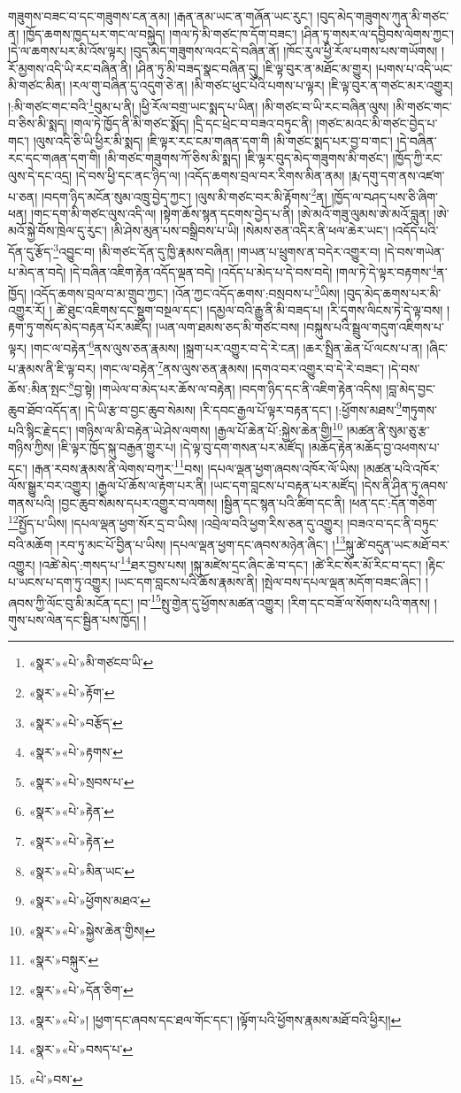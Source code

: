 \documentclass[12pt,a4paper]{book}
\begin{document}
གཟུགས་བཟང་བ་དང་གཟུགས་ངན་ནམ། །རྒན་ནམ་ཡང་ན་གཞོན་ཡང་རུང་། །བུད་མེད་གཟུགས་ཀུན་མི་གཙང་ན། །ཁྱོད་ཆགས་ཁྱད་པར་གང་ལ་བསྐྱེད། །གལ་ཏེ་མི་གཙང་ཁ་དོག་བཟང་། །ཤིན་ཏུ་གསར་ལ་དབྱིབས་ལེགས་ཀྱང་། །དེ་ལ་ཆགས་པར་མི་འོས་ལྟར། །བུད་མེད་གཟུགས་ལའང་དེ་བཞིན་ནོ། །ཁོང་རུལ་ཕྱི་རོལ་པགས་པས་གཡོགས། །རོ་མྱགས་འདི་ཡི་རང་བཞིན་ནི། །ཤིན་ཏུ་མི་བཟད་སྣང་བཞིན་དུ། །ཇི་ལྟ་བུར་ན་མཐོང་མ་གྱུར། །པགས་པ་འདི་ཡང་མི་གཙང་མིན། །རལ་གུ་བཞིན་དུ་འདུག་ཅེ་ན། །མི་གཙང་ཕུང་པོའི་པགས་པ་ལྟར། །ཇི་ལྟ་བུར་ན་གཙང་མར་འགྱུར། །:མི་གཙང་གང་བའི་\footnote{«སྣར་»«པེ་»མི་གཙངབ་ཡི་}བུམ་པ་ནི། །ཕྱི་རོལ་བགྲ་ཡང་སྨད་པ་ཡིན། །མི་གཙང་བ་ཡི་རང་བཞིན་ལུས། །མི་གཙང་གང་བ་ཅིས་མི་སྨད། །གལ་ཏེ་ཁྱོད་ནི་མི་གཙང་སྨོད། །དྲི་དང་ཕྲེང་བ་བཟའ་བཏུང་ནི། །གཙང་མའང་མི་གཙང་བྱེད་པ་གང་། །ལུས་འདི་ཅི་ཡི་ཕྱིར་མི་སྨད། །ཇི་ལྟར་རང་ངམ་གཞན་དག་གི །མི་གཙང་སྨད་པར་བྱ་བ་གང་། །དེ་བཞིན་རང་དང་གཞན་དག་གི། །མི་གཙང་གཟུགས་ཀོ་ཅིས་མི་སྨད། །ཇི་ལྟར་བུད་མེད་གཟུགས་མི་གཙང་། །ཁྱོད་ཀྱི་རང་ལུས་དེ་དང་འདྲ། །དེ་བས་ཕྱི་དང་ནང་ཉིད་ལ། །འདོད་ཆགས་བྲལ་བར་རིགས་མིན་ནམ། །རྨ་དགུ་དག་ནས་འཛག་པ་ཅན། །བདག་ཉིད་མངོན་སུམ་འཁྲུ་བྱེད་ཀྱང་། །ལུས་མི་གཙང་བར་མི་རྟོགས་\footnote{«སྣར་»«པེ་»རྟོག་}ན། །ཁྱོད་ལ་བཤད་པས་ཅི་ཞིག་ཕན། །གང་དག་མི་གཙང་ལུས་འདི་ལ། །སྟེག་ཆོས་སྙན་དངགས་བྱེད་པ་ནི། །ཨེ་མའོ་གཟུ་ལུམས་ཨེ་མའོ་བླུན། །ཨེ་མའོ་སྐྱེ་བོས་ཁྲེལ་དུ་རུང་། །མི་ཤེས་མུན་པས་བསྒྲིབས་པ་ཡི། །སེམས་ཅན་འདིར་ནི་ཕལ་ཆེར་ཡང་། །འདོད་པའི་དོན་དུ་རྩོད་\footnote{«སྣར་»«པེ་»བརྩོད་}འབྱུང་བ། །མི་གཙང་དོན་དུ་ཁྱི་རྣམས་བཞིན། །གཡན་པ་ཕྲུགས་ན་བདེར་འགྱུར་བ། །དེ་བས་གཡེན་པ་མེད་ན་བདེ། །དེ་བཞིན་འཇིག་རྟེན་འདོད་ལྡན་བདེ། །འདོད་པ་མེད་པ་དེ་བས་བདེ། །གལ་ཏེ་དེ་ལྟར་བརྟགས་\footnote{«སྣར་»«པེ་»རྟགས་}ན་ཁྱོད། །འདོད་ཆགས་བྲལ་བ་མ་གྲུབ་ཀྱང་། །འོན་ཀྱང་འདོད་ཆགས་:བསྲབས་པ་\footnote{«སྣར་»«པེ་»སྲབས་པ་}ཡིས། །བུད་མེད་ཆགས་པར་མི་འགྱུར་རོ། །
ཚེ་ཐུང་འཇིགས་དང་སྡུག་བསྔལ་དང་། །དམྱལ་བའི་རྒྱུ་ནི་མི་བཟད་པ། །རི་དྭགས་ལིངས་ཏེ་དེ་ལྟ་བས། །རྟག་ཏུ་གསོད་མེད་བརྟན་པོར་མཛོད། །ཡན་ལག་ཐམས་ཅད་མི་གཙང་བས། །བསྐུས་པའི་སྦྲུལ་གདུག་འཇིགས་པ་ལྟར། །གང་ལ་བརྟེན་\footnote{«སྣར་»«པེ་»རྟེན་}ནས་ལུས་ཅན་རྣམས། །སྐྲག་པར་འགྱུར་བ་དེ་རེ་ངན། །ཆར་སྤྲིན་ཆེན་པོ་ལངས་པ་ན། །ཞིང་པ་རྣམས་ནི་ཇི་ལྟ་བར། །གང་ལ་བརྟེན་\footnote{«སྣར་»«པེ་»རྟེན་}ནས་ལུས་ཅན་རྣམས། །དགའ་བར་འགྱུར་བ་དེ་རེ་བཟང་། །དེ་བས་ཆོས་:མིན་སྤང་\footnote{«སྣར་»«པེ་»མིན་ཡང་}བྱ་སྟེ། །གཡེལ་བ་མེད་པར་ཆོས་ལ་བརྟེན། །བདག་ཉིད་དང་ནི་འཇིག་རྟེན་འདིས། །བླ་མེད་བྱང་ཆུབ་ཐོབ་འདོད་ན། །དེ་ཡི་རྩ་བ་བྱང་ཆུབ་སེམས། །རི་དབང་རྒྱལ་པོ་ལྟར་བརྟན་དང་། །:ཕྱོགས་མཐས་\footnote{«སྣར་»«པེ་»ཕྱོགས་མཐའ་}གཏུགས་པའི་སྙིང་རྗེ་དང་། །གཉིས་ལ་མི་བརྟེན་ཡེ་ཤེས་ལགས། །རྒྱལ་པོ་ཆེན་པོ་:སྐྱེས་ཆེན་གྱི།\footnote{«སྣར་»«པེ་»སྐྱེས་ཆེན་གྱིས།} །མཚན་ནི་སུམ་ཅུ་རྩ་གཉིས་ཀྱིས། །ཇི་ལྟར་ཁྱོད་སྐུ་བརྒྱན་གྱུར་པ། །དེ་ལྟ་བུ་དག་གསན་པར་མཛོད། །མཆོད་རྟེན་མཆོད་བྱ་འཕགས་པ་དང་། །རྒན་རབས་རྣམས་ནི་ལེགས་བཀུར་\footnote{«སྣར་»བསྐུར་}བས། །དཔལ་ལྡན་ཕྱག་ཞབས་འཁོར་ལོ་ཡིས། །མཚན་པའི་འཁོར་ལོས་སྒྱུར་བར་འགྱུར། །རྒྱལ་པོ་ཆོས་ལ་རྟག་པར་ནི། །ཡང་དག་བླངས་པ་བརྟན་པར་མཛོད། །དེས་ནི་ཤིན་ཏུ་ཞབས་གནས་པའི། །བྱང་ཆུབ་སེམས་དཔར་འགྱུར་བ་ལགས། །སྦྱིན་དང་སྙན་པའི་ཚིག་དང་ནི། །ཕན་དང་:དོན་གཅིག་\footnote{«སྣར་»«པེ་»དོན་ཅིག་}སྤྱོད་པ་ཡིས། །དཔལ་ལྡན་ཕྱག་སོར་དྲ་བ་ཡིས། །འབྲེལ་བའི་ཕྱག་རིས་ཅན་དུ་འགྱུར། །བཟའ་བ་དང་ནི་བཏུང་བའི་མཆོག །རབ་ཏུ་མང་པོ་བྱིན་པ་ཡིས། །དཔལ་ལྡན་ཕྱག་དང་ཞབས་མཉེན་ཞིང་། །\footnote{«སྣར་»«པེ་»། །ཕྱག་དང་ཞབས་དང་ཐལ་གོང་དང་། །ལྟོག་པའི་ཕྱོགས་རྣམས་མཐོ་བའི་ཕྱིར།།}སྐུ་ཚེ་བདུན་ཡང་མཐོ་བར་འགྱུར། །འཚེ་མེད་:གསད་པ་\footnote{«སྣར་»«པེ་»བསད་པ་}ཐར་བྱས་པས། །སྐུ་མཛེས་དྲང་ཞིང་ཆེ་བ་དང་། །ཚེ་རིང་སོར་མོ་རིང་བ་དང་། །རྟིང་པ་ཡངས་པ་དག་ཏུ་འགྱུར། །ཡང་དག་བླངས་པའི་ཆོས་རྣམས་ནི། །སྤེལ་བས་དཔལ་ལྡན་མདོག་བཟང་ཞིང་། །ཞབས་ཀྱི་ལོང་བུ་མི་མངོན་དང་། །བ་\footnote{«པེ་»བས་}སྤུ་གྱེན་དུ་ཕྱོགས་མཚན་འགྱུར། །རིག་དང་བཟོ་ལ་སོགས་པའི་གནས། །གུས་པས་ལེན་དང་སྦྱིན་པས་ཁྱོད། །
\end{document}
